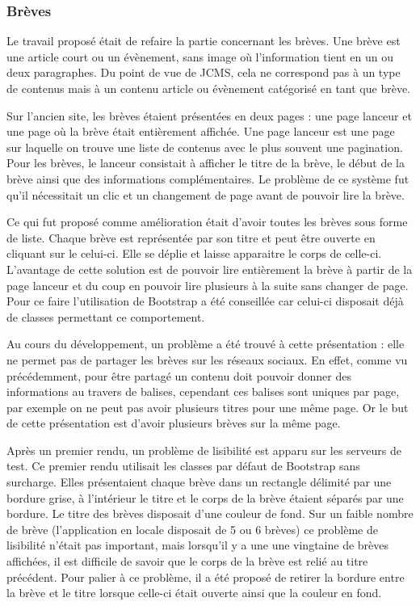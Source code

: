 \documentclass[12pt,a4paper]{article}
\begin{document}
\subsubsection{Brèves}
Le travail proposé était de refaire la partie concernant les brèves. Une brève est une article court ou un évènement, sans image où l'information tient en un ou deux paragraphes. Du point de vue de \gls{JCMS}, cela ne correspond pas à un type de contenus mais à un contenu article ou évènement catégorisé en tant que brève.\par
\medskip
Sur l'ancien site, les brèves étaient présentées en deux pages : une page lanceur et une page où la brève était entièrement affichée. Une page lanceur est une page sur laquelle on trouve une liste de contenus avec le plus souvent une pagination. Pour les brèves, le lanceur consistait à afficher le titre de la brève, le début de la brève ainsi que des informations complémentaires. Le problème de ce système fut qu'il nécessitait un clic et un changement de page avant de pouvoir lire la brève.\par
Ce qui fut proposé comme amélioration était d'avoir toutes les brèves sous forme de liste. Chaque brève est représentée par son titre et peut être ouverte en cliquant sur le celui-ci. Elle se déplie et laisse apparaitre le corps de celle-ci. L'avantage de cette solution est de pouvoir lire entièrement la brève à partir de la page lanceur et du coup en pouvoir lire plusieurs à la suite sans changer de page. Pour ce faire l'utilisation de Bootstrap a été conseillée car celui-ci disposait déjà de classes permettant ce comportement.\par
\medskip
Au cours du développement, un problème a été trouvé à cette présentation : elle ne permet pas de partager les brèves sur les réseaux sociaux. En effet, comme vu précédemment, pour être partagé un contenu doit pouvoir donner des informations au travers de balises, cependant ces balises sont uniques par page, par exemple on ne peut pas avoir plusieurs titres pour une même page. Or le but de cette présentation est d'avoir plusieurs brèves sur la même page.\par
Après un premier rendu, un problème de lisibilité est apparu sur les serveurs de test. Ce premier rendu utilisait les classes par défaut de Bootstrap sans surcharge. Elles présentaient chaque brève dans un rectangle délimité par une bordure grise, à l'intérieur le titre et le corps de la brève étaient séparés par une bordure. Le titre des brèves disposait d'une couleur de fond. Sur un faible nombre de brève (l'application en locale disposait de 5 ou 6 brèves) ce problème de lisibilité n'était pas important, mais lorsqu'il y a une une vingtaine de brèves affichées, il est difficile de savoir que le corps de la brève est relié au titre précédent. Pour palier à ce problème, il a été proposé de retirer la bordure entre la brève et le titre lorsque celle-ci était ouverte ainsi que la couleur en fond.\par
\end{document}

